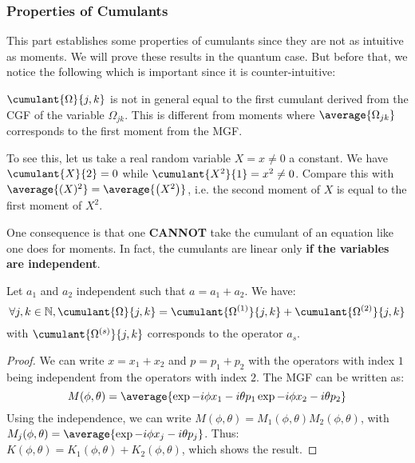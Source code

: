 \subsubsection{Properties of Cumulants}

This part establishes some properties of cumulants since they are not as intuitive as moments. We will prove these results in the quantum case. But before that, we notice the following which is important since it is counter-intuitive:

\begin{remark}
   $\cumulant{\Omega}{{j, k}}$ is not in general equal to the first cumulant derived from the CGF of the variable $\Omega_{j k}$. This is different from moments where $\average{\Omega_{j k}}$ corresponds to the first moment from the MGF.

   To see this, let us take a real random variable $X = x \neq 0$ a constant. We have $\cumulant{X}{2} = 0$ while $\cumulant{X^2}{1} = x^2 \neq 0$. Compare this with $\average{(X)^2} = \average{\left(X^2\right)}$, i.e. the second moment of $X$ is equal to the first moment of $X^2$.

   One consequence is that one \textbf{CANNOT} take the cumulant of an equation like one does for moments. In fact, the cumulants are linear only \textbf{if the variables are independent}.
\end{remark}

\begin{theorem}
    Let $a_1$ and $a_2$ independent such that $a = a_1 + a_2$. We have:
    \begin{equation}
        \forall j, k \in \mathbb{N}, \cumulant{\Omega}{{j, k}} = \cumulant{\Omega^{(1)}}{{j, k}} + \cumulant{\Omega^{(2)}}{{j, k}}
    \end{equation}
    with $\cumulant{\Omega^{(s)}}{{j, k}}$ corresponds to the operator $a_s$.
\end{theorem}

\begin{proof}
    We can write $x = x_1 + x_2$ and $p = p_1 + p_2$ with the operators with index $1$ being independent from the operators with index $2$. The MGF can be written as:
    \begin{equation}
        M(\phi, \theta) = \average{\exp{-i \phi x_1 -i \theta p_1} \exp{-i \phi x_2 -i \theta p_2}}
    \end{equation}
    Using the independence, we can write $M(\phi, \theta) = M_1(\phi, \theta) M_2(\phi, \theta)$, with $M_j(\phi, \theta) = \average{\exp{-i \phi x_j -i \theta p_j}}$. Thus: $K(\phi, \theta) = K_1(\phi, \theta) + K_2(\phi, \theta)$, which shows the result.
\end{proof}

